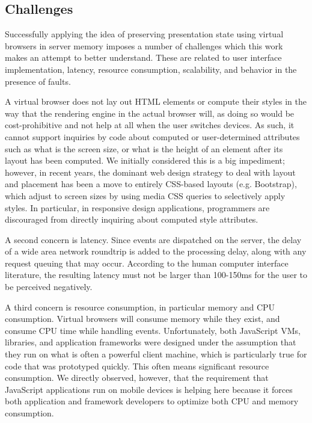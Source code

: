 \subsection{Challenges}
\webscaleout{}
Successfully applying the idea of preserving presentation state using virtual
browsers in server memory imposes a number of challenges which this work 
makes an attempt to better understand.
These are related to user interface implementation, latency, 
resource consumption, scalability, and behavior in the presence of faults.

A virtual browser does not lay out HTML elements or compute their styles in the
way that the rendering engine in the actual browser will, as doing so would be 
cost-prohibitive and not help at all when the user switches devices.  As such,
it cannot support inquiries by code about computed or user-determined
attributes such as what is the screen size, or what is the height of an
element after its layout has been computed.  We initially considered this is
a big impediment; however, in recent years, the dominant web design strategy
to deal with layout and placement has been a move to entirely CSS-based layouts
(e.g. Bootstrap), which adjust to screen sizes by using media CSS queries
to selectively apply styles.  In particular, in responsive design applications,
programmers are discouraged from directly inquiring about computed style
attributes.

A second concern is latency.  Since events are dispatched on the server,
the delay of a wide area network roundtrip is added to the processing delay,
along with any request queuing that may occur.  According to the human computer
interface literature, the resulting latency must not be larger than 100-150ms 
for the user to be perceived negatively.

A third concern is resource consumption, in particular memory and CPU consumption.
Virtual browsers will consume memory while they exist, and consume CPU time
while handling events.  Unfortunately, both JavaScript VMs, libraries, and
application frameworks were designed under the assumption that they run
on what is often a powerful client machine, which is particularly true for 
code that was prototyped quickly. This often means significant resource 
consumption.  We directly observed, however, that the requirement that JavaScript 
applications run on mobile devices is helping here because it forces both 
application and framework developers to optimize both CPU and memory 
consumption.

